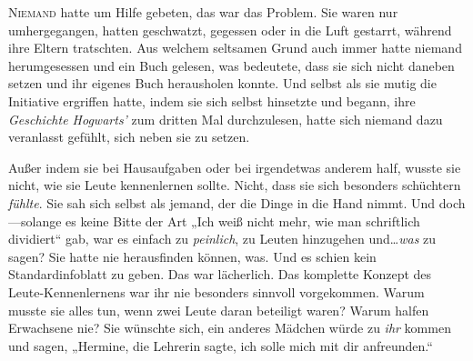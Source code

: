\lettrine{N}{iemand} hatte um Hilfe gebeten, das war das Problem. Sie waren nur umhergegangen, hatten geschwatzt, gegessen oder in die Luft gestarrt, während ihre Eltern tratschten. Aus welchem seltsamen Grund auch immer hatte niemand herumgesessen und ein Buch gelesen, was bedeutete, dass sie sich nicht daneben setzen und ihr eigenes Buch herausholen konnte. Und selbst als sie mutig die Initiative ergriffen hatte, indem sie sich selbst hinsetzte und begann, ihre \emph{Geschichte Hogwarts’} zum dritten Mal durchzulesen, hatte sich niemand dazu veranlasst gefühlt, sich neben sie zu setzen.

Außer indem sie bei Hausaufgaben oder bei irgendetwas anderem half, wusste sie nicht, wie sie Leute kennenlernen sollte. Nicht, dass sie sich besonders schüchtern \emph{fühlte}. Sie sah sich selbst als jemand, der die Dinge in die Hand nimmt. Und doch—solange es keine Bitte der Art „Ich weiß nicht mehr, wie man schriftlich dividiert“ gab, war es einfach zu \emph{peinlich}, zu Leuten hinzugehen und…\emph{was} zu sagen? Sie hatte nie herausfinden können, was. Und es schien kein Standardinfoblatt zu geben. Das war lächerlich. Das komplette Konzept des Leute-Kennenlernens war ihr nie besonders sinnvoll vorgekommen. Warum musste sie alles tun, wenn zwei Leute daran beteiligt waren? Warum halfen Erwachsene nie? Sie wünschte sich, ein anderes Mädchen würde zu \emph{ihr} kommen und sagen, „Hermine, die Lehrerin sagte, ich solle mich mit dir anfreunden.“

